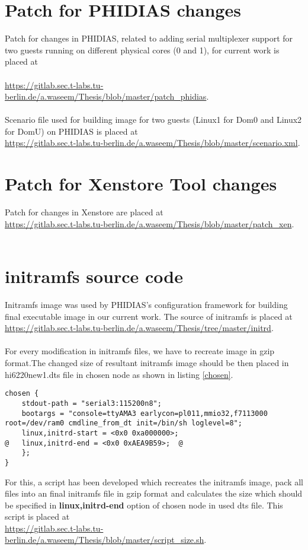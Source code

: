 \section{Patch for PHIDIAS changes \label{phidiaschanges}}
Patch for changes in PHIDIAS, related to adding serial multiplexer support for two guests running on different physical cores (0 and 1), for current work is placed at \\
\\
\url{https://gitlab.sec.t-labs.tu-berlin.de/a.waseem/Thesis/blob/master/patch_phidias}.
\\
\\
Scenario file used for building image for two guests (Linux1 for Dom0 and Linux2 for DomU) on PHIDIAS is placed at \\
\url{https://gitlab.sec.t-labs.tu-berlin.de/a.waseem/Thesis/blob/master/scenario.xml}.

\section{Patch for Xenstore Tool changes \label{xenstorechanges}}
Patch for changes in Xenstore are placed at \\
\url{https://gitlab.sec.t-labs.tu-berlin.de/a.waseem/Thesis/blob/master/patch_xen}.
\\
\\
\section{initramfs source code \label{xenstorechanges}}
Initramfs image was used by PHIDIAS's configuration framework for building final executable image in our current work. The source of initramfs is placed at \\
\url{https://gitlab.sec.t-labs.tu-berlin.de/a.waseem/Thesis/tree/master/initrd}.
\\
\\
For every modification in initramfs files, we have to recreate image in gzip format.The changed size of resultant initramfs image should be then placed in hi6220new1.dts file in chosen node as shown in listing \ref{chosen}.
\\
\begin{lstlisting}[caption= Chosen node in dts file for specifying initial ramdisk size ,frame=single,style=base, label={chosen}]
	chosen {
	stdout-path = "serial3:115200n8";
	bootargs = "console=ttyAMA3 earlycon=pl011,mmio32,f7113000 root=/dev/ram0 cmdline_from_dt init=/bin/sh loglevel=8";
	linux,initrd-start = <0x0 0xa000000>;
@	linux,initrd-end = <0x0 0xAEA9B59>;  @
	};
}

\end{lstlisting}
For this, a script has been developed which recreates the initramfs image, pack all files into an final initramfs file in gzip format and calculates the size which should be specified in \textbf{linux,initrd-end} option of chosen node in used dts file. This script is placed at \\
\url{https://gitlab.sec.t-labs.tu-berlin.de/a.waseem/Thesis/blob/master/script_size.sh}.
\\
\\

